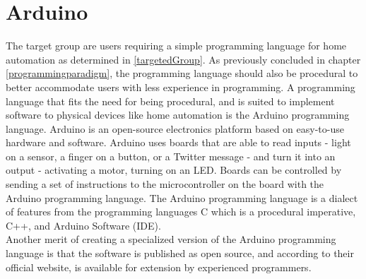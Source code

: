 \section{Arduino}
The target group are users requiring a simple programming language for home automation as determined in \ref{targetedGroup}. As previously concluded in chapter \ref{programmingparadigm}, the programming language should also be procedural to better accommodate users with less experience in programming.
A programming language that fits the need for being procedural, and is suited to implement software to physical devices like home automation is the Arduino programming language. Arduino is an open-source electronics platform based on easy-to-use hardware and software. Arduino uses boards that are able to read inputs - light on a sensor, a finger on a button, or a Twitter message - and turn it into an output - activating a motor, turning on an LED. Boards can be controlled by sending a set of instructions to the microcontroller on the board with the Arduino programming language. The Arduino programming language is a dialect of features from the programming languages C which is a procedural imperative, C++, and Arduino Software (IDE)\cite{audionocc}. \\


Another merit of creating a specialized version of the Arduino programming language is that the software is published as open source, and according to their official website, is available for extension by experienced programmers\cite{audionocc}.








